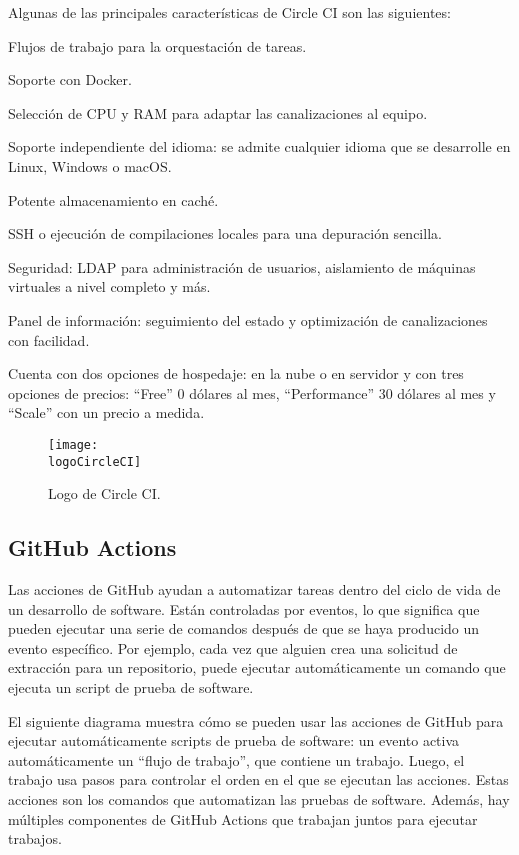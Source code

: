 Algunas de las principales características de Circle CI son las siguientes:
\begin{compactitem}
    \item Flujos de trabajo para la orquestación de tareas.
    \item Soporte con Docker.
    \item Selección de CPU y RAM para adaptar las canalizaciones al equipo.
    \item Soporte independiente del idioma: se admite cualquier idioma que se desarrolle en Linux, Windows o macOS.
    \item Potente almacenamiento en caché.
    \item SSH o ejecución de compilaciones locales para una depuración sencilla.
    \item Seguridad: LDAP para administración de usuarios, aislamiento de máquinas virtuales a nivel completo y más.
    \item Panel de información: seguimiento del estado y optimización de canalizaciones con facilidad.
\end{compactitem}
Cuenta con dos opciones de hospedaje: en la nube o en servidor y con tres opciones de precios: “Free” 0 dólares al mes, “Performance” 30 dólares al mes y “Scale” con un precio a medida.

\begin{figure}[h]
    \centering
    \texttt{[image: \\logoCircleCI]}
    \caption{Logo de Circle CI.}
\end{figure}

\subsection{GitHub Actions}
Las acciones de GitHub ayudan a automatizar tareas dentro del ciclo de vida de un desarrollo de software. Están controladas por eventos, lo que significa que pueden ejecutar una serie de comandos después de que se haya producido un evento específico. Por ejemplo, cada vez que alguien crea una solicitud de extracción para un repositorio, puede ejecutar automáticamente un comando que ejecuta un script de prueba de software.

El siguiente diagrama muestra cómo se pueden usar las acciones de GitHub para ejecutar automáticamente scripts de prueba de software: un evento activa automáticamente un “flujo de trabajo”, que contiene un trabajo. Luego, el trabajo usa pasos para controlar el orden en el que se ejecutan las acciones. Estas acciones son los comandos que automatizan las pruebas de software. Además, hay múltiples componentes de GitHub Actions que trabajan juntos para ejecutar trabajos.

